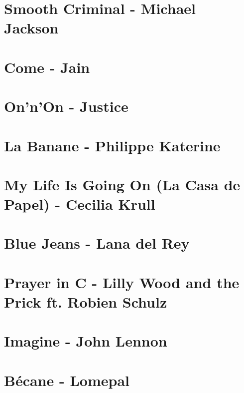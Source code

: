 \documentclass[11pt]{article}
\begin{document}
\section{Smooth Criminal - Michael Jackson}
\begin{guitar}

\end{guitar}

\section{Come - Jain}
\begin{guitar}

\end{guitar}

\section{On'n'On - Justice}


\section{La Banane - Philippe Katerine}


\section{My Life Is Going On (La Casa de Papel) - Cecilia Krull }
\begin{guitar}

\end{guitar}

\section{Blue Jeans - Lana del Rey}


\section{Prayer in C - Lilly Wood and the Prick ft. Robien Schulz}



\section{Imagine - John Lennon}


\section{Bécane - Lomepal}

\end{document}

